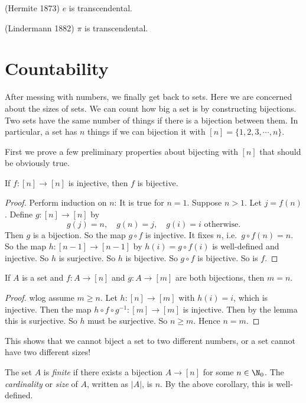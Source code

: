 \documentclass[a4paper]{article}
\begin{document}
\begin{thm}
  (Hermite 1873) $e$ is transcendental.
\end{thm}
\begin{thm}
  (Lindermann 1882) $\pi$ is transcendental.
\end{thm}

\section{Countability}
After messing with numbers, we finally get back to sets. Here we are concerned about the sizes of sets. We can count how big a set is by constructing bijections. Two sets have the same number of things if there is a bijection between them. In particular, a set has $n$ things if we can bijection it with $[n] = \{1, 2, 3, \cdots, n\}$.

First we prove a few preliminary properties about bijecting with $[n]$ that should be obviously true.

\begin{lemma}
  If $f:[n] \to [n]$ is injective, then $f$ is bijective.
\end{lemma}

\begin{proof}
  Perform induction on $n$: It is true for $n = 1$. Suppose $n > 1$. Let $j = f(n)$. Define $g: [n]\to [n]$ by
  \[
    g(j) = n,\quad g(n) = j, \quad g(i) = i \text{ otherwise}.
  \]
  Then $g$ is a bijection. So the map $g\circ f$ is injective. It fixes $n$, i.e.\ $g\circ f(n) = n$. So the map $h:[n - 1]\to [n - 1]$ by $h(i) = g\circ f(i)$ is well-defined and injective. So $h$ is surjective. So $h$ is bijective. So $g\circ f$ is bijective. So is $f$.
\end{proof}

\begin{cor}
  If $A$ is a set and $f: A\to [n]$ and $g: A\to [m]$ are both bijections, then $m = n$.
\end{cor}

\begin{proof}
  wlog assume $m \geq n$. Let $h: [n]\to [m]$ with $h(i) = i$, which is injective. Then the map $h\circ f\circ g^{-1}: [m]\to [m]$ is injective. Then by the lemma this is surjective. So $h$ must be surjective. So $n\geq m$. Hence $n = m$.
\end{proof}
This shows that we cannot biject a set to two different numbers, or a set cannot have two different sizes!

\begin{defi}
  The set $A$ is \emph{finite} if there exists a bijection $A\to [n]$ for some $n\in\N_0$. The \emph{cardinality} or \emph{size} of $A$, written as $|A|$, is $n$. By the above corollary, this is well-defined.
\end{defi}
\end{document}
